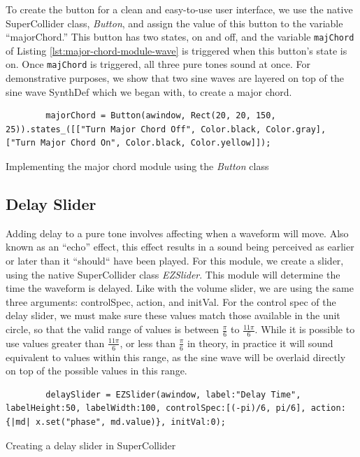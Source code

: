 To create the button for a clean and easy-to-use user interface, we use the native SuperCollider class, \textit{Button}, and assign the value of this button to the variable ``majorChord.'' This button has two states, on and off, and the variable \texttt{majChord} of Listing \ref{lst:major-chord-module-wave} is triggered when this button's state is on. Once \texttt{majChord} is triggered, all three pure tones sound at once. For demonstrative purposes, we show that two sine waves are layered on top of the sine wave SynthDef which we began with, to create a major chord.

\begin{listing}
	\begin{lstlisting}
		majorChord = Button(awindow, Rect(20, 20, 150, 25)).states_([["Turn Major Chord Off", Color.black, Color.gray], ["Turn Major Chord On", Color.black, Color.yellow]]);	
	\end{lstlisting}
	\label{lst:major-chord-button-wave}
	\caption{Implementing the major chord module using the \textit{Button} class}
\end{listing}

\subsection{Delay Slider}

Adding delay to a pure tone involves affecting when a waveform will move. Also known as an ``echo'' effect, this effect results in a sound being perceived as earlier or later than it ``should`` have been played. For this module, we create a slider, using the native SuperCollider class \textit{EZSlider}. This module will determine the time the waveform is delayed. Like with the volume slider, we are using the same three arguments: controlSpec, action, and initVal. For the control spec of the delay slider, we must make sure these values match those available in the unit circle, so that the valid range of values is between $\frac{\pi}{6}$ to $\frac{11\pi}{6}$. While it is possible to use values greater than $\frac{11\pi}{6}$, or less than $\frac{\pi}{6}$ in theory, in practice it will sound equivalent to values within this range, as the sine wave will be overlaid directly on top of the possible values in this range. 

\begin{listing}
	\begin{lstlisting}
		delaySlider = EZSlider(awindow, label:"Delay Time", labelHeight:50, labelWidth:100, controlSpec:[(-pi)/6, pi/6], action: {|md| x.set("phase", md.value)}, initVal:0);	
	\end{lstlisting}
	\caption{Creating a delay slider in SuperCollider}
	\label{lst:delay-slider}
\end{listing}


